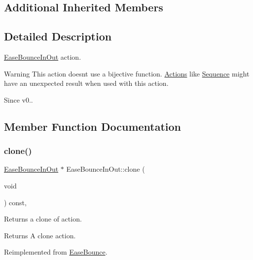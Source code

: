 \subsection*{Additional Inherited Members}


\subsection{Detailed Description}
\hyperlink{classEaseBounceInOut}{Ease\+Bounce\+In\+Out} action. 

\begin{DoxyWarning}{Warning}
This action doesn\textquotesingle{}t use a bijective function. \hyperlink{classActions}{Actions} like \hyperlink{classSequence}{Sequence} might have an unexpected result when used with this action. 
\end{DoxyWarning}
\begin{DoxySince}{Since}
v0.. 
\end{DoxySince}


\subsection{Member Function Documentation}
\mbox{\label{classEaseBounceInOut_acc12db9c905d8d49b135e084a9beef5e}} 
\subsubsection{\texorpdfstring{clone()}{clone()}}
{\footnotesize\ttfamily \hyperlink{classEaseBounceInOut}{Ease\+Bounce\+In\+Out} $\ast$ Ease\+Bounce\+In\+Out\+::clone (\begin{DoxyParamCaption}\item[{void}]{ }\end{DoxyParamCaption}) const\hspace{0.3cm}{\ttfamily [override]}, {\ttfamily [virtual]}}

Returns a clone of action.

\begin{DoxyReturn}{Returns}
A clone action. 
\end{DoxyReturn}


Reimplemented from \hyperlink{classEaseBounce_a3a39e9fa829cc40be5f2114787a98db6}{Ease\+Bounce}.

\mbox{\label{classEaseBounceInOut_acb4ffccc3c3234d5ef58e82334e48ce8}} 
